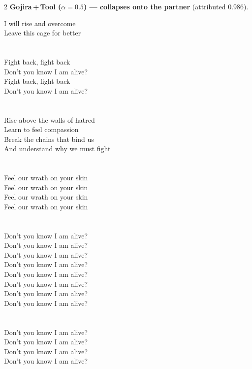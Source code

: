 \begin{multicols}{2}
\nopagebreak\noindent\textbf{Gojira\,+\,Tool ($\alpha{=}0.5$) --- collapses onto the partner} (attributed 0.986).\par\nopagebreak\vspace{4pt}
{\footnotesize\itshape\raggedright
I will rise and overcome \\
Leave this cage for better \\
\mbox{} \\
\mbox{} \\
Fight back, fight back \\
Don't you know I am alive? \\
Fight back, fight back \\
Don't you know I am alive? \\
\mbox{} \\
\mbox{} \\
Rise above the walls of hatred \\
Learn to feel compassion \\
Break the chains that bind us \\
And understand why we must fight \\
\mbox{} \\
\mbox{} \\
Feel our wrath on your skin \\
Feel our wrath on your skin \\
Feel our wrath on your skin \\
Feel our wrath on your skin \\
\mbox{} \\
\mbox{} \\
Don't you know I am alive? \\
Don't you know I am alive? \\
Don't you know I am alive? \\
Don't you know I am alive? \\
Don't you know I am alive? \\
Don't you know I am alive? \\
Don't you know I am alive? \\
Don't you know I am alive? \\
\mbox{} \\
\mbox{} \\
Don't you know I am alive? \\
Don't you know I am alive? \\
Don't you know I am alive? \\
Don't you know I am alive?\par}
\medskip


\end{multicols}

